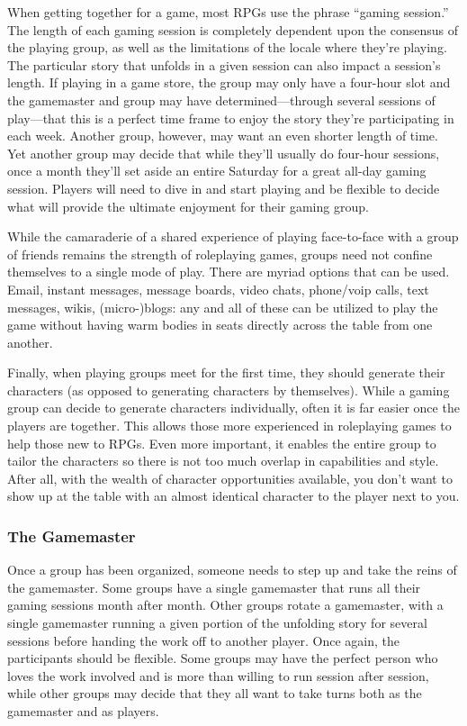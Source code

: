 When getting together for a game, most RPGs 
use the phrase ``gaming session.'' The length of each 
gaming session is completely dependent upon the consensus of the playing group, as well as the limitations 
of the locale where they're playing. The particular 
story that unfolds in a given session can also impact a 
session's length. If playing in a game store, the group 
may only have a four-hour slot and the gamemaster 
and group may have determined—through several sessions of play—that this is a perfect time frame to enjoy 
the story they're participating in each week. Another 
group, however, may want an even shorter length of 
time. Yet another group may decide that while they'll 
usually do four-hour sessions, once a month they'll 
set aside an entire Saturday for a great all-day gaming 
session. Players will need to dive in and start playing and be flexible to decide what will provide the 
ultimate enjoyment for their gaming group.

While the camaraderie of a shared experience of 
playing face-to-face with a group of friends remains 
the strength of roleplaying games, groups need not 
confine themselves to a single mode of play. There are 
myriad options that can be used. Email, instant messages, message boards, video chats, phone/voip calls, 
text messages, wikis, (micro-)blogs: any and all of 
these can be utilized to play the game without having 
warm bodies in seats directly across the table from 
one another.

Finally, when playing groups meet for the first time, 
they should generate their characters (as opposed to 
generating characters by themselves). While a gaming 
group can decide to generate characters individually, 
often it is far easier once the players are together. This 
allows those more experienced in roleplaying games to 
help those new to RPGs. Even more important, it enables the entire group to tailor the characters so there 
is not too much overlap in capabilities and style. After 
all, with the wealth of character opportunities available, you don't want to show up at the table with an 
almost identical character to the player next to you.

\subsubsection{The Gamemaster}

Once a group has been organized, someone needs to 
step up and take the reins of the gamemaster. Some 
groups have a single gamemaster that runs all their 
gaming sessions month after month. Other groups 
rotate a gamemaster, with a single gamemaster running a given portion of the unfolding story for several sessions before handing the work off to another 
player. Once again, the participants should be flexible. 
Some groups may have the perfect person who loves 
the work involved and is more than willing to run 
session after session, while other groups may decide 
that they all want to take turns both as the gamemaster and as players.


